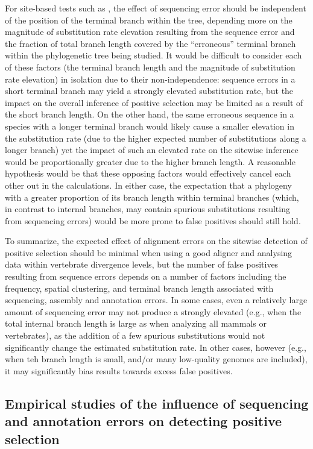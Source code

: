 For site-based tests such as \slr, the effect of sequencing error
should be independent of the position of the terminal branch within
the tree, depending more on the magnitude of \nsyn substitution rate
elevation resulting from the sequence error and the fraction of total
branch length covered by the ``erroneous'' terminal branch within the
phylogenetic tree being studied. It would be difficult to consider
each of these factors (the terminal branch length and the magnitude of
\nsyn substitution rate elevation) in isolation due to their
non-independence: sequence errors in a short terminal branch may yield
a strongly elevated \nsyn substitution rate, but the impact on the
overall inference of positive selection may be limited as a result of
the short branch length. On the other hand, the same erroneous
sequence in a species with a longer terminal branch would likely cause
a smaller elevation in the \nsyn substitution rate (due to the higher
expected number of substitutions along a longer branch) yet the impact
of such an elevated rate on the sitewise inference would be
proportionally greater due to the higher branch length. A reasonable
hypothesis would be that these opposing factors would effectively
cancel each other out in the \ml calculations. In either case, the
expectation that a phylogeny with a greater proportion of its branch
length within terminal branches (which, in contrast to internal
branches, may contain spurious substitutions resulting from sequencing
errors) would be more prone to false positives should still hold.

To summarize, the expected effect of alignment errors on the sitewise
detection of positive selection should be minimal when using a good
aligner and analysing data within vertebrate divergence levels, but
the number of false positives resulting from sequence errors depends
on a number of factors including the frequency, spatial clustering,
and terminal branch length associated with sequencing, assembly and
annotation errors. In some cases, even a relatively large amount of
sequencing error may not produce a strongly elevated \fpr (e.g., when
the total internal branch length is large as when analyzing all
mammals or vertebrates), as the addition of a few spurious
substitutions would not significantly change the estimated \nsyn
substitution rate. In other cases, however (e.g., when teh branch
length is small, and/or many low-quality genomes are included), it may
significantly bias results towards excess false positives.

\subsection{Empirical studies of the influence of sequencing and annotation errors on detecting positive selection}

